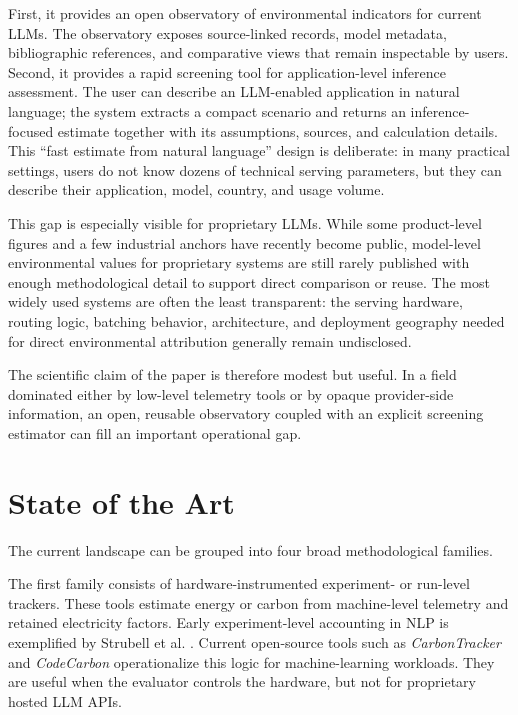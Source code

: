 \documentclass[10pt,a4paper]{article}
\begin{document}
First, it provides an open observatory of environmental indicators for current LLMs. The observatory exposes source-linked records, model metadata, bibliographic references, and comparative views that remain inspectable by users. Second, it provides a rapid screening tool for application-level inference assessment. The user can describe an LLM-enabled application in natural language; the system extracts a compact scenario and returns an inference-focused estimate together with its assumptions, sources, and calculation details. This ``fast estimate from natural language'' design is deliberate: in many practical settings, users do not know dozens of technical serving parameters, but they can describe their application, model, country, and usage volume.

This gap is especially visible for proprietary LLMs. While some product-level figures and a few industrial anchors have recently become public, model-level environmental values for proprietary systems are still rarely published with enough methodological detail to support direct comparison or reuse. The most widely used systems are often the least transparent: the serving hardware, routing logic, batching behavior, architecture, and deployment geography needed for direct environmental attribution generally remain undisclosed.

The scientific claim of the paper is therefore modest but useful. In a field dominated either by low-level telemetry tools or by opaque provider-side information, an open, reusable observatory coupled with an explicit screening estimator can fill an important operational gap.

\section{State of the Art}
The current landscape can be grouped into four broad methodological families.

The first family consists of hardware-instrumented experiment- or run-level trackers. These tools estimate energy or carbon from machine-level telemetry and retained electricity factors. Early experiment-level accounting in NLP is exemplified by Strubell et al. \cite{strubell2019}. Current open-source tools such as \emph{CarbonTracker} \cite{anthony2020carbontracker} and \emph{CodeCarbon} \cite{codecarbon2026} operationalize this logic for machine-learning workloads. They are useful when the evaluator controls the hardware, but not for proprietary hosted LLM APIs.
\end{document}
